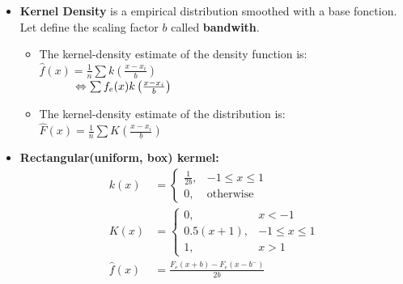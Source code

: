 \documentclass[10pt, french]{article}
\begin{document}
\begin{multicols*}{3}
\begin{itemize}[align=left,leftmargin=*]
    \item \textbf{Kernel Density} is a empirical distribution smoothed with a base fonction. Let define the scaling factor $b$ called \textbf{bandwith}. \\
    \begin{itemize}
        \item  The kernel-density estimate of the density function is: $\hat{f}(x) = \frac{1}{n} \sum k \left( \frac{x-x_i}{b} \right)$ \\ $\hspace*{1.1cm} \Leftrightarrow \sum f_e(x)k\left( \frac{x-x_i}{b} \right)$
        \item  The kernel-density estimate of the distribution is: $\hat{F}(x) = \frac{1}{n} \sum K \left( \frac{x-x_i}{b} \right)$
    \end{itemize}
    \item \textbf{Rectangular(uniform, box) kermel:}
    \begin{align*}
        k(x) &=
            \left\{
                \begin{array}{cc}
                    \frac{1}{2b}, & -1 \leq x \leq 1 \\
                    0,   & \mathrm{otherwise}
                \end{array}
            \right. \\
        K(x) &=
        \left\{
            \begin{array}{cc}
                0, & x < -1 \\
                0.5(x+1), & -1 \leq x \leq 1 \\
                1,   & x > 1
            \end{array}
        \right.\\
        \hat{f}(x) &= \frac{F_e(x+b)-F_e(x-b^-)}{2b}
    \end{align*}


\end{itemize}
\end{multicols*}
\end{document}
